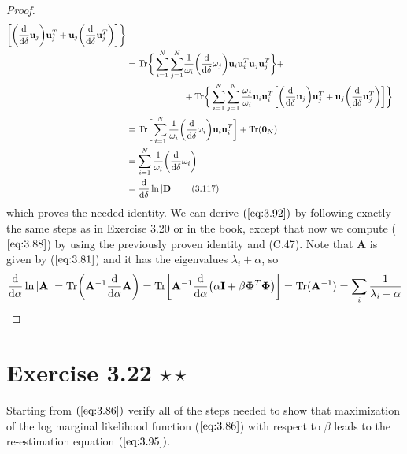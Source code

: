 \begin{proof}
\begin{align*}
\begin{aligned}[t]
            \bigg[\bigg(\dv{\delta} \mathbf{u}_j\bigg)\mathbf{u}_j^T
        + \mathbf{u}_j\bigg(\dv{\delta}\mathbf{u}_j^T\bigg)\bigg]\bigg\} 
        \end{aligned} \\
        &= \begin{aligned}[t]
            \text{Tr}\bigg\{\sum_{i=1}^{N} \sum_{j=1}^{N} &
                \frac{1}{\omega_i} \bigg(\dv{\delta}\omega_j\bigg) \mathbf{u}_i\mathbf{u}_i^T 
            \mathbf{u}_j\mathbf{u}_j^T \bigg\} + \\
                &+ \text{Tr}\bigg\{\sum_{i=1}^{N} \sum_{j=1}^{N} 
                \frac{\omega_j}{\omega_i} \mathbf{u}_i\mathbf{u}_i^T
            \bigg[\bigg(\dv{\delta} \mathbf{u}_j\bigg)\mathbf{u}_j^T
            + \mathbf{u}_j\bigg(\dv{\delta}\mathbf{u}_j^T\bigg)\bigg]\bigg\} 
        \end{aligned} \\
        &= \text{Tr}\bigg[\sum_{i=1}^{N} \frac{1}{\omega_i}\bigg(\dv{\delta} \omega_i\bigg)
        \mathbf{u}_i\mathbf{u}_i^T\bigg] + \text{Tr}(\mathbf{0}_N) \\
        &= \sum_{i=1}^{N} \frac{1}{\omega_i} \bigg(\dv{\delta} \omega_i\bigg) \\
        &= \dv{\delta} \ln |\mathbf{D}| \tag{3.117}
    \end{align*}
    which proves the needed identity. We can derive $(\ref{eq:3.92})$ 
    by following exactly the same steps as in Exercise 3.20 or in the book,
    except that now we compute ($\ref{eq:3.88}$) by using the previously
    proven identity and (C.47). Note that $\mathbf{A}$ is given by ($\ref{eq:3.81}$)
    and it has the eigenvalues $\lambda_i + \alpha$, so
    \[
        \dv{\alpha}\ln |\mathbf{A}| 
        = \text{Tr}\bigg(\mathbf{A}^{-1}\dv{\alpha}\mathbf{A}\bigg)
        = \text{Tr}\bigg[\mathbf{A}^{-1}
        \dv{\alpha}(\alpha\mathbf{I} + \beta\mathbf{\Phi}^T\mathbf{\Phi})\bigg]
        = \text{Tr}(\mathbf{A}^{-1})
        = \sum_{i} \frac{1}{\lambda_i + \alpha} 
    \] 
\end{proof}

\section*{Exercise 3.22 $\star \star$}
Starting from $(\ref{eq:3.86})$ verify all of the steps needed
to show that maximization of the log marginal likelihood function
($\ref{eq:3.86}$) with respect to $\beta$ leads to the re-estimation
equation $(\ref{eq:3.95})$.

